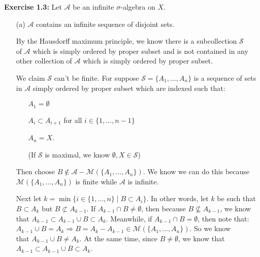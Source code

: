 \documentclass{book}
\newcommand{\exTwoP}{%
   \color{RedViolet}%
   \fontsize{13}{15}\selectfont%
}
\newcommand{\exPPP}{%
   \color{VioletRed}%
   \fontsize{12}{14}\selectfont%
}
\newenvironment{myIndent}{%
   \begin{adjustwidth}{2.5em}{0em}%
}{%
   \end{adjustwidth}%
}
\newenvironment{myTindent}{%
   \begin{adjustwidth}{7.5em}{0em}%
}{%
   \end{adjustwidth}%
}
\newcommand{\blab}[1]{\textbf{#1}}
\newcommand{\retTwo}{\hfill\bigbreak}
\begin{document}
\blab{Exercise 1.3:} Let $\mathcal{A}$ be an infinite $\sigma$-algebra on $X$.
\begin{itemize}
   \item[(a)] $\mathcal{A}$ contains an infinite sequence of disjoint sets.
   
   \begin{myIndent}\exTwoP
      By the Hausdorff maximum principle, we know there is a subcollection $\mathcal{S}$\\ of $\mathcal{A}$ which is simply ordered by proper subset and is not contained in any other collection of $\mathcal{A}$ which is simply ordered by proper subset.\retTwo
      
      We claim $\mathcal{S}$ can't be finite. For suppose $\mathcal{S} = \{A_1, \ldots, A_n\}$ is a sequence of sets in $\mathcal{A}$ simply ordered by proper subset which are indexed such that:
      \begin{itemize}
         \item[\bullet] $A_1 = \emptyset$
         \item[\bullet] $A_i \subset A_{i + 1}$ for all $i \in \{1, \ldots, n-1\}$
         \item[\bullet] $A_n = X$.
         
         \begin{myTindent}\exPPP
            (If $\mathcal{S}$ is maximal, we know $\emptyset, X \in \mathcal{S}$)\retTwo
         \end{myTindent}
      \end{itemize} 
      
      Then choose $B \notin \mathcal{A} - \mathcal{M}(\{A_1, \ldots, A_n\})$. We know we can do this because $\mathcal{M}(\{A_1, \ldots, A_n\})$ is finite while $\mathcal{A}$ is infinite.\retTwo
      
      Next let $k = \min\{i \in \{1, \ldots, n\} \mid B \subset A_i\}$. In other words, let $k$ be such that $B \subset A_k$ but $B \not\subset A_{k-1}$. If $A_{k-1} \cap B \neq \emptyset$, then because $B \not\subseteq A_{k-1}$, we know that $A_{k-1} \subset A_{k-1} \cup B \subset A_{k}$. Meanwhile, if $A_{k-1} \cap B = \emptyset$, then note that:\\ $A_{k-1} \cup B = A_k \Longrightarrow B = A_k - A_{k-1} \in \mathcal{M}(\{A_1, \ldots, A_n\})$. So we know\\ that $A_{k-1} \cup B \neq A_k$. At the same time, since $B \neq \emptyset$, we know that\\ $A_{k-1} \subset A_{k-1} \cup B \subset A_k$.\retTwo


\end{myIndent}
\end{itemize}
\end{document}

